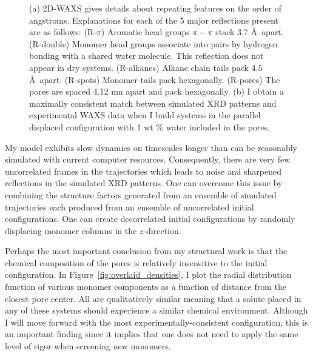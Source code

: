 \documentclass{article}
\begin{document}
\begin{figure}
\begin{subfigure}{0.49\linewidth}
	\end{subfigure}
    \caption{(a) 2D-WAXS gives details about repeating features on the order of
    angstroms. Explanations for each of the 5 major reflections present are
    as follows: (R-$\pi$) Aromatic head groups $\pi-\pi$ stack 3.7 \AA~apart. 
    (R-double) Monomer head groups associate into pairs by hydrogen bonding with
    a shared water molecule. This reflection does not appear in dry systems. 
    (R-alkanes) Alkane chain tails pack 4.5 \AA~apart. (R-spots) Monomer tails
    pack hexagonally. (R-pores) The pores are spaced 4.12 nm apart and pack 
    hexagonally. (b) I obtain a maximally consistent match between simulated
    XRD patterns and experimental WAXS data when I build systems in the 
    parallel displaced configuration with 1 wt \% water included in the pores.
    }\label{fig:WAXS_comparison}
    \vspace{-0.75cm}
 \end{figure}
 
  My model exhibits slow dynamics on timescales longer than can be reasonably
  simulated with current computer resources. Consequently, there are very few
  uncorrelated frames in the trajectories which leads to noise and sharpened
  reflections in the simulated XRD patterns. One can overcome this issue by 
  combining the structure factors generated from an ensemble of simulated 
  trajectories each produced from an ensemble of uncorrelated initial 
  configurations. One can create decorrelated initial configurations by 
  randomly displacing monomer columns in the $z$-direction.
 
  Perhaps the most important conclusion from my structural work is that the 
  chemical composition of the pores is relatively insensitive to the initial 
  configuration. In Figure~\ref{fig:overlaid_densities}, I plot the radial 
  distribution function of various monomer components as a function of distance
  from the closest pore center. All are qualitatively similar meaning that a 
  solute placed in any of these systems should experience a similar chemical 
  environment. Although I will move forward with the most experimentally-consistent 
  configuration, this is an important finding since it implies that one does
  not need to apply the same level of rigor when screening new monomers.
  
\end{document}
